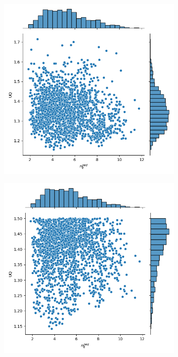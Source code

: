 \documentclass[a4paper, twoside, final, 12pt]{article}
\begin{document}
{\begin{figure}
\begin{subfigure}{0.3\linewidth}
		\includegraphics[scale=0.3]{./src/GP_MLP_hetero_neped_uncerts}
		\caption{}
		\label{subfig:hetero_gp_input}
	\end{subfigure}
	\begin{subfigure}{0.33\linewidth}
		\centering
		\includegraphics[scale=0.3]{./src/GP_RatQuad_w_neped_uncert_the_uncert}

\end{subfigure}
\end{figure}}
\end{document}

